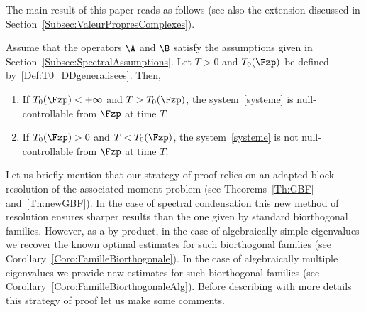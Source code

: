 The main result of this paper reads as follows (see also the extension discussed in Section~\ref{Subsec:ValeurPropresComplexes}).
\begin{theo} \label{Thm:Main}
Assume that the operators $\A$ and $\B$ satisfy the assumptions given in Section~\ref{Subsec:SpectralAssumptions}. Let $T>0$ and $T_0(\Fzp)$ be defined by~\eqref{Def:T0_DDgeneralisees}. Then,
\begin{enumerate}\romanenumi
\item \label{Thm:Main_pt1}
If $T_0(\Fzp) <+\infty$ and $T>T_0(\Fzp)$, the system~\eqref{systeme} is null-controllable from $\Fzp$ at time $T$.
\item \label{Thm:Main_pt2}
If $T_0(\Fzp) >0$ and $T<T_0(\Fzp)$, the system~\eqref{systeme} is not null-controllable from $\Fzp$ at time $T$.
\end{enumerate}
\end{theo}
Let us briefly mention that our strategy of proof relies on an adapted block resolution of the associated moment problem (see Theorems~\ref{Th:GBF} and~\ref{Th:newGBF}). In the case of spectral condensation this new method of resolution ensures sharper results than the one given by standard biorthogonal families. However, as a by-product, in the case of algebraically simple eigenvalues we recover the known optimal estimates for such biorthogonal families (see Corollary~\ref{Coro:FamilleBiorthogonale}). In the case of algebraically multiple eigenvalues we provide new estimates for such biorthogonal families (see Corollary~\ref{Coro:FamilleBiorthogonaleAlg}). Before describing with more details this strategy of proof let us make some comments.
